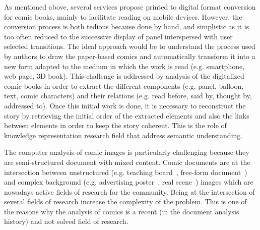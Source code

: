 
As mentioned above, several services propose printed to digital format conversion for comic books, mainly to facilitate reading on mobile devices.
However, the conversion process is both tedious because done by hand, and simplistic as it is too often reduced to the successive display of panel interspersed with user selected transitions.
The ideal approach would be to understand the process used by authors to draw the paper-based comics and automatically transform it into a new form adapted to the medium in which the work is read (e.g. smartphone, web page, 3D book). 
This challenge is addressed by analysis of the digitalized comic books in order to extract the different components (e.g. panel, balloon, text, comic characters) and their relations (e.g. read before, said by, thought by, addressed to).
Once this initial work is done, it is necessary to reconstruct the story by retrieving the initial order of the extracted elements and also the links between elements in order to keep the story coherent.
This is the role of knowledge representation research field that address semantic understanding.%



The computer analysis of comic images is particularly challenging because they are semi-structured document with mixed content.
Comic documents are at the intersection between unstructured (e.g. teaching board~\cite{Oliveira10}, free-form document~\cite{Delaye2014Multi}) and complex background (e.g. advertising poster~\cite{Clavelli09}, real scene~\cite{Weinman09,Epshtein10,Neumann12}) images which are nowadays active fields of research for the community.
Being at the intersection of several fields of research increase the complexity of the problem.
This is one of the reasons why the analysis of comics is a recent (in the document analysis history) and not solved field of research.



